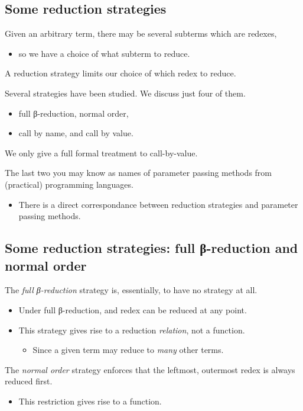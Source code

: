 \documentclass[11pt]{article}
\theoremstyle{definition}
\begin{document}
\subsection{Some reduction strategies}
\label{sec:org6836dc9}
Given an arbitrary term, there may be several subterms which are redexes,
\begin{itemize}
\item so we have a choice of what subterm to reduce.
\end{itemize}
A reduction strategy limits our choice of which redex to reduce.

Several strategies have been studied. We discuss just four of them.
\begin{itemize}
\item full β-reduction, normal order,
\item call by name, and call by value.
\end{itemize}
We only give a full formal treatment to call-by-value.

The last two you may know as names of parameter passing methods
from (practical) programming languages.
\begin{itemize}
\item There is a direct correspondance between reduction strategies
and parameter passing methods.
\end{itemize}

\subsection{Some reduction strategies: full β-reduction and normal order}
\label{sec:org48d52c0}
The \emph{full β-reduction} strategy is, essentially, to have no
strategy at all.
\begin{itemize}
\item Under full β-reduction, and redex can be reduced at any point.
\item This strategy gives rise to a reduction \emph{relation},
not a function.
\begin{itemize}
\item Since a given term may reduce to \emph{many} other terms.
\end{itemize}
\end{itemize}

The \emph{normal order} strategy enforces that the
leftmost, outermost redex is always reduced first.
\begin{itemize}
\item This restriction gives rise to a function.
\end{itemize}
\end{document}
